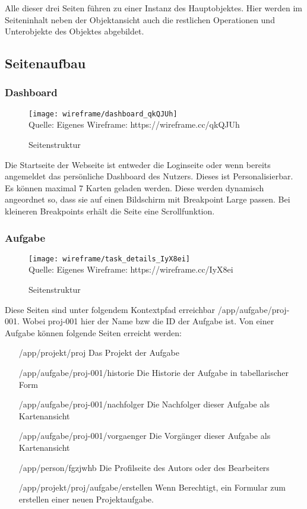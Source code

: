 Alle dieser drei Seiten führen zu einer Instanz des Hauptobjektes.
Hier werden im Seiteninhalt neben der Objektansicht auch die restlichen Operationen und Unterobjekte des Objektes abgebildet.

\subsection{Seitenaufbau}

\subsubsection{Dashboard}

\begin{figure}[H]
    \caption{Seitenstruktur}
    \texttt{[image: wireframe/dashboard\_qkQJUh]}
    \\
    Quelle: Eigenes Wireframe: https://wireframe.cc/qkQJUh
\end{figure}

Die Startseite der Webseite ist entweder die Loginseite oder wenn bereits angemeldet das persönliche Dashboard des Nutzers.
Dieses ist Personalisierbar.
Es können maximal 7 Karten geladen werden.
Diese werden dynamisch angeordnet so, dass sie auf einen Bildschirm mit Breakpoint Large passen.
Bei kleineren Breakpoints erhält die Seite eine Scrollfunktion.

\subsubsection{Aufgabe}

\begin{figure}[H]
    \caption{Seitenstruktur}
    \texttt{[image: wireframe/task\_details\_IyX8ei]}
    \\
    Quelle: Eigenes Wireframe: https://wireframe.cc/IyX8ei
\end{figure}

Diese Seiten sind unter folgendem Kontextpfad erreichbar /app/aufgabe/proj-001.
Wobei proj-001 hier der Name bzw die ID der Aufgabe ist.
Von einer Aufgabe können folgende Seiten erreicht werden:

\begin{itemize}
    \item[/app/projekt/proj] Das Projekt der Aufgabe
    \item[/app/aufgabe/proj-001/historie] Die Historie der Aufgabe in tabellarischer Form
    \item[/app/aufgabe/proj-001/nachfolger] Die Nachfolger dieser Aufgabe als Kartenansicht
    \item[/app/aufgabe/proj-001/vorgaenger] Die Vorgänger dieser Aufgabe als Kartenansicht
    \item[/app/person/fgzjwhb] Die Profilseite des Autors oder des Bearbeiters
    \item[/app/projekt/proj/aufgabe/erstellen] Wenn Berechtigt, ein Formular zum erstellen einer neuen Projektaufgabe.
\end{itemize}

